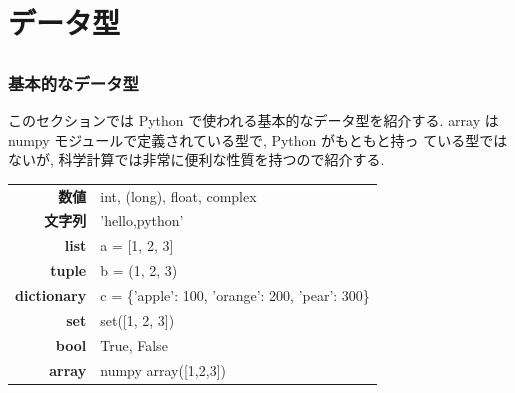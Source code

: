 \section{データ型}

\subsection*{\redm\whiteb\greenb}
\begin{frame}[t, fragile]
\frametitle{基本的なデータ型}
\alert{このセクションでは Python で使われる基本的なデータ型を紹介する. } array は numpy モジュールで定義されている型で, Python がもともと持っ
ている型ではないが, 科学計算では非常に便利な性質を持つので紹介する. 

\begin{table}[hb]
 \begin{tabular}{r|l} 
  \textbf{数値}       & int, (long), float, complex \\
  \textbf{文字列}     & 'hello,python' \\
  \textbf{list}       & a = [1, 2, 3] \\
  \textbf{tuple}      & b = (1, 2, 3) \\
  \textbf{dictionary} & c = \{'apple': 100, 'orange': 200, 'pear': 300\} \\
  \textbf{set}        & set([1, 2, 3]) \\
  \textbf{bool}       & True, False \\
  \textbf{array}      & numpy array([1,2,3]) \\
 \end{tabular}
\end{table}
\end{frame}

